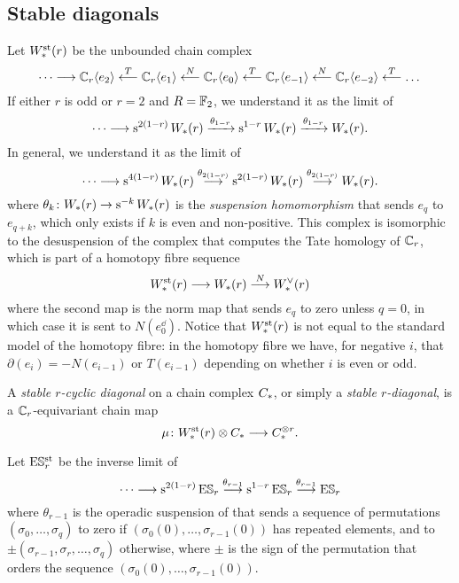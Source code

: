 \subsection{Stable diagonals}\label{s:stable}

Let $W^{\mathrm{st}}_{*}(r)$ be the unbounded chain complex
\[
\dotsb \longrightarrow \mathbb{C}_r\langle e_2\rangle 
\overset{T}{\longleftarrow}
\mathbb{C}_r\langle e_1\rangle 
\overset{N}{\longleftarrow}
\mathbb{C}_r\langle e_0\rangle 
\overset{T}{\longleftarrow}
\mathbb{C}_r\langle e_{-1}\rangle 
\overset{N}{\longleftarrow}
\mathbb{C}_r\langle e_{-2}\rangle 
\overset{T}{\longleftarrow}
\dots
\]
If either $r$ is odd or $r=2$ and $R=\mathbb{F}_2$, we understand it as the limit of
\[
\dotsb \longrightarrow \operatorname{s}^{2(1-r)}W_{*}(r) \xrightarrow{\theta_{1-r}} \operatorname{s}^{1-r} W_{*}(r) \xrightarrow{\theta_{1-r}} W_{*}(r).
\]
In general, we understand it as the limit of
\[
\dotsb \longrightarrow \operatorname{s}^{4(1-r)}W_{*}(r)\overset{\theta_{2(1-r)}}{\longrightarrow} \operatorname{s}^{2(1-r)} W_{*}(r) \overset{\theta_{2(1-r)}}{\longrightarrow} W_{*}(r).
\]
where $\theta_{k} \colon W_{*}(r) \to \operatorname{s}^{-k} W_{*}(r)$ is the \emph{suspension homomorphism} that sends $e_{q}$ to $e_{q+k}$, which only exists if $k$ is even and non-positive.
This complex is isomorphic to the desuspension of the complex that computes the Tate homology of $\mathbb{C}_r$, which is part of a homotopy fibre sequence
\[
W^{\mathrm{st}}_{*}(r) \longrightarrow W_{*}(r)\overset{N}{\longrightarrow} W^\vee_{*}(r)
\]
where the second map is the norm map that sends $e_q$ to zero unless $q=0$, in which case it is sent to $N(e_0^\dd)$.
Notice that $W^{\mathrm{st}}_{*}(r)$ is not equal to the standard model of the homotopy fibre: in the homotopy fibre we have, for negative $i$, that $\partial(e_i) = -N(e_{i-1})$ or $T(e_{i-1})$ depending on whether $i$ is even or odd.

\begin{definition}
	A \emph{stable $r$-cyclic diagonal} on a chain complex $C_{*}$, or simply a \textit{stable $r$-diagonal}, is a $\mathbb{C}_r$-equivariant chain map
	\[
	\mu \colon W^{\mathrm{st}}_{*}(r) \otimes C_{*} \longrightarrow C_{*}^{\otimes r}.
	\]
\end{definition}

\begin{definition}
	Let $\mathrm{E}\mathbb{S}^{\mathrm{st}}_r$ be the inverse limit of
	\[
	\dotsb \longrightarrow \operatorname{s}^{2(1-r)} \mathrm{E}\mathbb{S}_r\overset{\theta_{r-1}}{\longrightarrow}\operatorname{s}^{1-r} \mathrm{E}\mathbb{S}_r\overset{\theta_{r-1}}{\longrightarrow} \mathrm{E}\mathbb{S}_r
	\]
	where $\theta_{r-1}$ is the operadic suspension of \cite{berger2004combinatorial} that sends a sequence of permutations $(\sigma_0,\dots,\sigma_q)$ to zero if $(\sigma_0(0),\dots,\sigma_{r-1}(0))$ has repeated elements, and to $\pm (\sigma_{r-1},\sigma_r,\dots,\sigma_q)$ otherwise, where $\pm$ is the sign of the permutation that orders the sequence $(\sigma_0(0),\dots,\sigma_{r-1}(0))$.
\end{definition}

